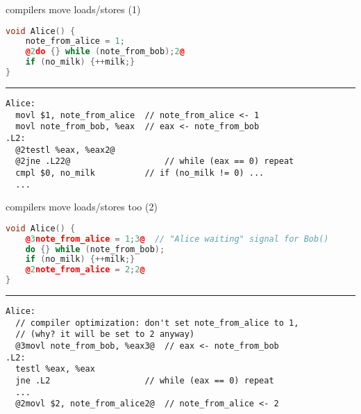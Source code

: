 \begin{frame}[fragile,label=compReorder]{compilers move loads/stores (1)}
\begin{lstlisting}[language=C++,style=small,
    moredelim={**[is][\btHL<2|handout:2>]{@2}{2@}},
    moredelim={**[is][\btHL<3|handout:3>]{@3}{3@}},
    moredelim={**[is][\btHL<4|handout:4>]{@4}{4@}},
    moredelim={**[is][\btHL<5|handout:5>]{@5}{5@}},
]
void Alice() {
    note_from_alice = 1;
    @2do {} while (note_from_bob);2@
    if (no_milk) {++milk;}
}
\end{lstlisting}
\hrule
\begin{lstlisting}[language=myasm,style=small,
    moredelim={**[is][\btHL<2|handout:2>]{@2}{2@}},
    moredelim={**[is][\btHL<3|handout:3>]{@3}{3@}},
    moredelim={**[is][\btHL<4|handout:4>]{@4}{4@}},
    moredelim={**[is][\btHL<5|handout:5>]{@5}{5@}},
]
Alice:
  movl $1, note_from_alice  // note_from_alice <- 1
  movl note_from_bob, %eax  // eax <- note_from_bob
.L2:
  @2testl %eax, %eax2@
  @2jne .L22@                   // while (eax == 0) repeat
  cmpl $0, no_milk          // if (no_milk != 0) ...
  ...
\end{lstlisting}
\end{frame}

\begin{frame}[fragile,label=compReorder2]{compilers move loads/stores too (2)}
\begin{lstlisting}[language=C++,style=small,
    moredelim={**[is][\btHL<2|handout:2>]{@2}{2@}},
    moredelim={**[is][\btHL<3|handout:3>]{@3}{3@}},
    moredelim={**[is][\btHL<4|handout:4>]{@4}{4@}},
    moredelim={**[is][\btHL<5|handout:5>]{@5}{5@}},
]
void Alice() {
    @3note_from_alice = 1;3@  // "Alice waiting" signal for Bob()
    do {} while (note_from_bob);
    if (no_milk) {++milk;}
    @2note_from_alice = 2;2@
}
\end{lstlisting}
\hrule
\begin{lstlisting}[language=myasm,style=small,
    moredelim={**[is][\btHL<2|handout:2>]{@2}{2@}},
    moredelim={**[is][\btHL<3|handout:3>]{@3}{3@}},
    moredelim={**[is][\btHL<4|handout:4>]{@4}{4@}},
    moredelim={**[is][\btHL<5|handout:5>]{@5}{5@}},
]
Alice:  
  // compiler optimization: don't set note_from_alice to 1,
  // (why? it will be set to 2 anyway)
  @3movl note_from_bob, %eax3@  // eax <- note_from_bob
.L2:
  testl %eax, %eax          
  jne .L2                   // while (eax == 0) repeat
  ...
  @2movl $2, note_from_alice2@  // note_from_alice <- 2
\end{lstlisting}
\end{frame}
